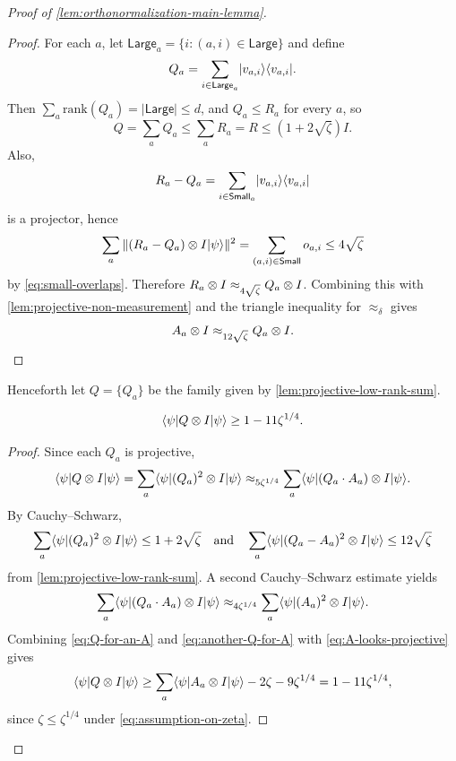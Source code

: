 \begin{proof}[Proof of \ref{lem:orthonormalization-main-lemma}]
\begin{proof}
		For each $a$, let $\mathsf{Large}_a=\{i : (a,i)\in \mathsf{Large}\}$ and define
		\[
			Q_a = \sum_{i \in \mathsf{Large}_a} \lvert v_{a,i} \rangle\langle v_{a,i} \rvert.
		\]
		Then $\sum_a \mathrm{rank}(Q_a)=|\mathsf{Large}| \leq d$, and $Q_a \leq R_a$ for every $a$, so
		\[
			Q = \sum_a Q_a \leq \sum_a R_a = R \leq (1+2\sqrt{\zeta})I.
		\]
		Also,
		\[
			R_a-Q_a = \sum_{i \in \mathsf{Small}_a} \lvert v_{a,i} \rangle\langle v_{a,i} \rvert
		\]
		is a projector, hence
		\[
			\sum_a \Vert (R_a-Q_a)\otimes I \lvert \psi \rangle\Vert^2
			=
			\sum_{(a,i)\in\mathsf{Small}} o_{a,i}
			\leq
			4\sqrt{\zeta}
		\]
		by \ref{eq:small-overlaps}. Therefore $R_a \otimes I \approx_{4\sqrt{\zeta}} Q_a \otimes I$. Combining this with \ref{lem:projective-non-measurement} and the triangle inequality for $\approx_\delta$ gives
		\[
			A_a \otimes I \approx_{12\sqrt{\zeta}} Q_a \otimes I.
		\]
	\end{proof}

	Henceforth let $Q=\{Q_a\}$ be the family given by \ref{lem:projective-low-rank-sum}.

	\begin{lemma}[Completeness of~$Q$]\label{lem:Q-completeness}
		\leanok
		\begin{equation*}
			\langle \psi \rvert Q \otimes I \lvert \psi \rangle
			\geq
			1 - 11 \zeta^{1/4}.
		\end{equation*}
	\end{lemma}
	\begin{proof}
		\leanok
		Since each $Q_a$ is projective,
		\begin{equation}\label{eq:Q-for-an-A}
			\langle \psi \rvert Q \otimes I \lvert \psi \rangle
			=
			\sum_a \langle \psi \rvert (Q_a)^2 \otimes I \lvert \psi \rangle
			\approx_{5\zeta^{1/4}}
			\sum_a \langle \psi \rvert (Q_a \cdot A_a)\otimes I \lvert \psi \rangle.
		\end{equation}
		By Cauchy--Schwarz,
		\[
			\sum_a \langle \psi \rvert (Q_a)^2 \otimes I \lvert \psi \rangle \leq 1+2\sqrt{\zeta}
			\quad\text{and}\quad
			\sum_a \langle \psi \rvert (Q_a-A_a)^2 \otimes I \lvert \psi \rangle \leq 12\sqrt{\zeta}
		\]
		from \ref{lem:projective-low-rank-sum}.
		A second Cauchy--Schwarz estimate yields
		\begin{equation}\label{eq:another-Q-for-A}
			\sum_a \langle \psi \rvert (Q_a \cdot A_a)\otimes I \lvert \psi \rangle
			\approx_{4\zeta^{1/4}}
			\sum_a \langle \psi \rvert (A_a)^2 \otimes I \lvert \psi \rangle.
		\end{equation}
		Combining \ref{eq:Q-for-an-A} and \ref{eq:another-Q-for-A} with \ref{eq:A-looks-projective} gives
		\[
			\langle \psi \rvert Q \otimes I \lvert \psi \rangle
			\geq
			\sum_a \langle \psi \rvert A_a \otimes I \lvert \psi \rangle - 2\zeta - 9\zeta^{1/4}
			=
			1 - 11\zeta^{1/4},
		\]
		since $\zeta \leq \zeta^{1/4}$ under \ref{eq:assumption-on-zeta}.
	\end{proof}


\end{proof}
